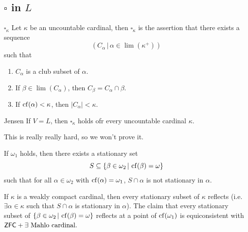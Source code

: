 \documentclass{article}
\begin{document}
\subsection{$\square$ in $L$}
\begin{fancydefine}{$\square_{\kappa}$}
    Let $\kappa$ be an uncountable cardinal, then $\square_{\kappa}$ is the assertion that there exists a sequence \[ (C_{\alpha} \, | \, \alpha \in \lim(\kappa^{+}))\] such that \begin{enumerate}
        \item[(i)] $C_{\alpha}$ is a club subset of $\alpha$.
        \item[(ii)] If $\beta \in \lim(C_{\alpha})$, then $C_{\beta} = C_{\alpha} \cap \beta$.
        \item[(iii)] If $\operatorname{cf}(\alpha) < \kappa$, then $|C_{\alpha}| < \kappa$.
    \end{enumerate}
\end{fancydefine}
\begin{fancythm}{Jensen}
    If $V=L$, then $\square_{\kappa}$ holds ofr every uncountable cardinal $\kappa$.
\end{fancythm}
\proof This is really really hard, so we won't prove it. \endproof
\begin{fancylem}{}
    If $\omega_{1}$ holds, then there exists a stationary set \[ S \subseteq \{ \beta \in \omega_{2} \, | \, \operatorname{cf}(\beta) = \omega\}\] such that for all $\alpha \in \omega_{2}$ with $\operatorname{cf}(\alpha)=\omega_{1}$, $S \cap \alpha$ is not stationary in $\alpha$.
\end{fancylem}
\begin{remark*}
    If $\kappa$ is a weakly compact cardinal, then every stationary subset of $\kappa$ reflects (i.e. $\exists \alpha \in \kappa$ such that $S \cap \alpha$ is stationary in $\alpha$). The claim that every stationary subset of $\{\beta \in \omega_{2} \, | \, \operatorname{cf}(\beta) = \omega\}$ reflects at a point of $\operatorname{cf}(\omega_{1})$ is equiconsistent with $\mathsf{ZFC} + \exists \text{ Mahlo cardinal.}$
\end{remark*}
\newlec
\end{document}
